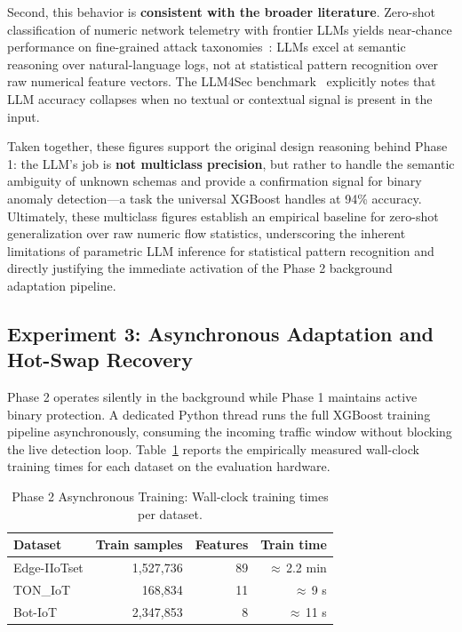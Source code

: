\documentclass[conference]{IEEEtran}
\begin{document}
Second, this behavior is \textbf{consistent with the broader literature}. Zero-shot classification of numeric network telemetry with frontier LLMs yields near-chance performance on fine-grained attack taxonomies~\cite{zhang2025llms, karlsen2024llm4sec}: LLMs excel at semantic reasoning over natural-language logs, not at statistical pattern recognition over raw numerical feature vectors. The LLM4Sec benchmark~\cite{karlsen2024llm4sec} explicitly notes that LLM accuracy collapses when no textual or contextual signal is present in the input.

Taken together, these figures support the original design reasoning behind Phase 1: the LLM's job is \textbf{not multiclass precision}, but rather to handle the semantic ambiguity of unknown schemas and provide a confirmation signal for binary anomaly detection---a task the universal XGBoost handles at 94\% accuracy. Ultimately, these multiclass figures establish an empirical baseline for zero-shot generalization over raw numeric flow statistics, underscoring the inherent limitations of parametric LLM inference for statistical pattern recognition and directly justifying the immediate activation of the Phase 2 background adaptation pipeline.

\subsection{Experiment 3: Asynchronous Adaptation and Hot-Swap Recovery}
\label{subsec:exp3}

Phase 2 operates silently in the background while Phase 1 maintains active binary protection. A dedicated Python thread runs the full XGBoost training pipeline asynchronously, consuming the incoming traffic window without blocking the live detection loop. Table~\ref{tab:training_time} reports the empirically measured wall-clock training times for each dataset on the evaluation hardware.

\begin{table}[htbp]
    \centering
    \caption{Phase 2 Asynchronous Training: Wall-clock training times per dataset.}
    \label{tab:training_time}
    \begin{tabular}{|l|r|r|r|}
        \hline
        \textbf{Dataset} & \textbf{Train samples} & \textbf{Features} & \textbf{Train time} \\
        \hline
        Edge-IIoTset     & 1{,}527{,}736          & 89                & $\approx$\,2.2 min  \\
        TON\_IoT         & 168{,}834              & 11                & $\approx$\,9 s      \\
        Bot-IoT          & 2{,}347{,}853          & 8                 & $\approx$\,11 s     \\
        \hline
    \end{tabular}
\end{table}
\end{document}
